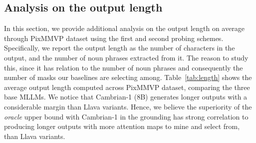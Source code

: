 \subsection{Analysis on the output length}
In this section, we provide additional analysis on the output length on average through PixMMVP dataset using the first and second probing schemes. Specifically, we report the output length as the number of characters in the output, and the number of noun phrases extracted from it. The reason to study this, since it has relation to the number of noun phrases and consequently the number of masks our baselines are selecting among. Table~\ref{tab:length} shows the average output length computed across PixMMVP dataset, comparing the three base MLLMs. We notice that Cambrian-1 (8B) generates longer outputs with a considerable margin than Llava variants. Hence, we believe the superiority of the \textit{oracle} upper bound with Cambrian-1 in the grounding has strong correlation to producing longer outputs with more attention maps to mine and select from, than Llava variants. %

\begin{table}[t]
\centering
{}
\caption{The average output length across PixMMVP dataset for the three base MLLMs using the first and second probing techniques.}
\label{tab:length}
\end{table}

%
